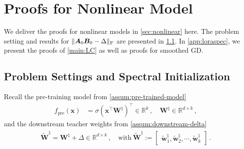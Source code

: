 \section{Proofs for Nonlinear Model}
\label{lora_nonlinear}

We deliver the proofs for nonlinear models in \cref{sec:nonlinear} here.
The problem setting and results for $\| \bm A_0 \bm B_0 - \Delta \|_{\rm F}$ are presented in \cref{app:problemnon}.
In \cref{app:loraspec}, we present the proofs of \cref{main:LC} as well as proofs for smoothed GD.

\subsection{Problem Settings and Spectral Initialization}
\label{app:problemnon}
Recall the pre-training model from \cref{assum:pre-trained-model}
\begin{align}
    f_\text{pre}\left(\bm x\right) & = \sigma\left(\bm x^{\!\top}\bm W^\natural\right)^{\!\top} \in \mathbb{R}^k \,,\quad \bm W^\natural\in\mathbb{R}^{d\times k}\,,
\end{align}
and the downstream teacher weights from \cref{assum:downstream-delta}
\begin{align*}
    \widetilde{\bm W}^\natural = \bm W^\natural+\Delta \in \mathbb{R}^{d \times k}\,, \quad \mbox{with}~  \widetilde{\bm W}^\natural := \begin{bmatrix}
        \widetilde{\bm w}_1^{\natural}, \widetilde{\bm w}_2^{\natural}, \cdots, \widetilde{\bm w}_k^{\natural}
    \end{bmatrix}\,.
\end{align*}


